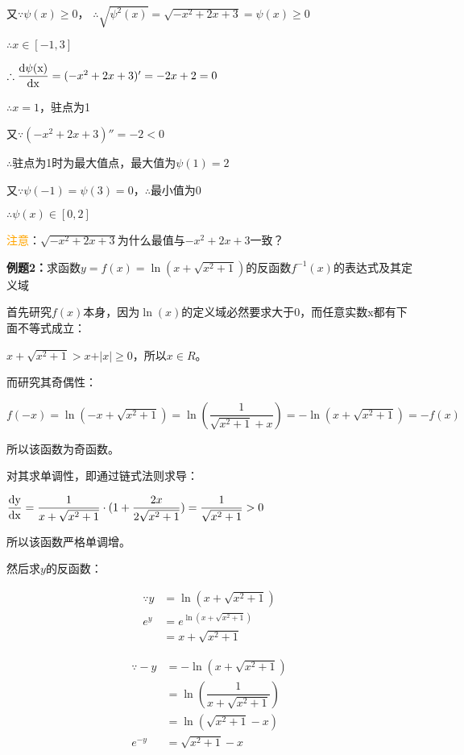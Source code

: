 \documentclass[UTF8, 12pt]{ctexart}
\begin{document}
又$\because\psi(x)\geqslant 0$， $\therefore\sqrt{\psi^2(x)}=\sqrt{-x^2+2x+3}=\psi(x)\geqslant 0$

$\therefore x\in[-1,3]$

$\therefore\dfrac{\rm{d}\psi(x)}{\rm{d}x}=(-x^2+2x+3)'=-2x+2=0$

$\therefore x=1$，驻点为1

又$\because(-x^2+2x+3)''=-2<0$

$\therefore$驻点为1时为最大值点，最大值为$\psi(1)=2$

又$\because\psi(-1)=\psi(3)=0$，$\therefore$最小值为0

$\therefore\psi(x)\in[0,2]$

\textcolor{orange}{注意}：$\sqrt{-x^2+2x+3}$为什么最值与$-x^2+2x+3$一致？

\textbf{例题2：}求函数$y=f(x)=\ln(x+\sqrt{x^2+1})$的反函数$f^{-1}(x)$的表达式及其定义域

首先研究$f(x)$本身，因为$\ln(x)$的定义域必然要求大于0，而任意实数x都有下面不等式成立：

$x+\sqrt{x^2+1}>x+\vert x\vert \geqslant 0$，所以$x\in R$。

而研究其奇偶性：

$f(-x)=\ln(-x+\sqrt{x^2+1})=\ln(\dfrac{1}{\sqrt{x^2+1}+x})=-\ln(x+\sqrt{x^2+1})=-f(x)$

所以该函数为奇函数。

对其求单调性，即通过链式法则求导：

$\dfrac{\rm{d}y}{\rm{d}x}=\dfrac{1}{x+\sqrt{x^2+1}}\cdot (1+\dfrac{2x}{2\sqrt{x^2+1}})=\dfrac{1}{\sqrt{x^2+1}}>0$

所以该函数严格单调增。

然后求$y$的反函数：

$$
    \begin{aligned}
        \because y & =\ln(x+\sqrt{x^2+1})     \\
        e^y        & =e^{\ln(x+\sqrt{x^2+1})} \\
                   & =x+\sqrt{x^2+1}
    \end{aligned}
$$

$$
    \begin{aligned}
        \because -y & =-\ln(x+\sqrt{x^2+1})          \\
                    & =\ln(\dfrac{1}{x+\sqrt{x^2+1}}) \\
                    & =\ln(\sqrt{x^2+1}-x)           \\
        e^{-y}      & =\sqrt{x^2+1}-x
    \end{aligned}
$$
\end{document}
